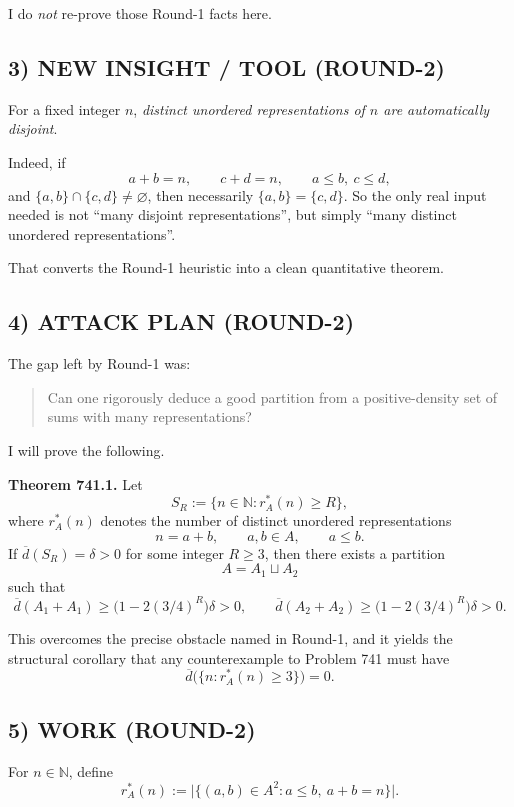 I do \emph{not} re-prove those Round-1 facts here.

\subsection*{3) NEW INSIGHT / TOOL (ROUND-2)}

For a fixed integer $n$, \emph{distinct unordered representations of $n$ are automatically disjoint}.

Indeed, if
\[
a+b=n,\qquad c+d=n,\qquad a\le b,\ c\le d,
\]
and $\{a,b\}\cap\{c,d\}\neq\varnothing$, then necessarily $\{a,b\}=\{c,d\}$.
So the only real input needed is not ``many disjoint representations'', but simply ``many distinct unordered representations''.

That converts the Round-1 heuristic into a clean quantitative theorem.

\subsection*{4) ATTACK PLAN (ROUND-2)}

The gap left by Round-1 was:
\begin{quote}
Can one rigorously deduce a good partition from a positive-density set of sums with many representations?
\end{quote}

I will prove the following.

\medskip
\noindent
\textbf{Theorem 741.1.}
Let
\[
S_R:=\{n\in\mathbb N : r_A^{\ast}(n)\ge R\},
\]
where $r_A^{\ast}(n)$ denotes the number of distinct unordered representations
\[
n=a+b,\qquad a,b\in A,\qquad a\le b.
\]
If $\overline d(S_R)=\delta>0$ for some integer $R\ge 3$, then there exists a partition
\[
A=A_1\sqcup A_2
\]
such that
\[
\overline d(A_1+A_1)\ge \bigl(1-2(3/4)^R\bigr)\delta>0,
\qquad
\overline d(A_2+A_2)\ge \bigl(1-2(3/4)^R\bigr)\delta>0.
\]

This overcomes the precise obstacle named in Round-1, and it yields the structural corollary that any counterexample to Problem 741 must have
\[
\overline d\bigl(\{n:r_A^{\ast}(n)\ge 3\}\bigr)=0.
\]

\subsection*{5) WORK (ROUND-2)}

For $n\in\mathbb N$, define
\[
r_A^{\ast}(n):=\bigl|\{(a,b)\in A^2:a\le b,\ a+b=n\}\bigr|.
\]

